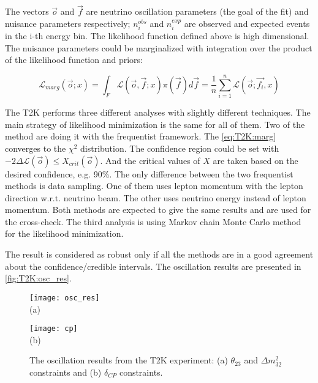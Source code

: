 \documentclass[../main.tex]{subfiles}
\begin{document}
The vectors $\overrightarrow{o}$ and $\overrightarrow{f}$ are neutrino oscillation parameters (the goal of the fit) and nuisance parameters respectively; $n_i^{obs}$ and $n_i^{exp}$ are observed and expected events in the i-th energy bin. The likelihood function defined above is high dimensional. The nuisance parameters could be marginalized with integration over the product of the likelihood function and priors:

\begin{equation}
\mathcal{L}_{marg}\left(\overrightarrow{o}; x\right)=\int_F\mathcal{L}\left(\overrightarrow{o},\overrightarrow{f};x\right)\pi(\overrightarrow{f})d\overrightarrow{f}=\frac{1}{n}\sum_{i=1}^{n}\mathcal{L}\left(\overrightarrow{o}; \overrightarrow{f_i}, x\right)
\label{eq:T2K:marg}
\end{equation}


The T2K performs three different analyses with slightly different techniques. The main strategy of likelihood minimization is the same for all of them. Two of the method are doing it with the frequentist framework. The \autoref{eq:T2K:marg} converges to the $\chi^2$ distribution. The confidence region could be set with $-2\Delta\mathcal{L}(\overrightarrow{o})\leqslant X_{crit}(\overrightarrow{o})$. And the critical values of $X$ are taken based on the desired confidence, e.g. 90\%. The only difference between the two frequentist methods is data sampling. One of them uses lepton momentum with the lepton direction w.r.t. neutrino beam. The other uses neutrino energy instead of lepton momentum. Both methods are expected to give the same results and are used for the cross-check. The third analysis is using Markov chain Monte Carlo method for the likelihood minimization.

The result is considered as robust only if all the methods are in a good agreement about the confidence/credible intervals. The oscillation results are presented in \autoref{fig:T2K:osc_res}.

\begin{figure}[!ht]
  \centering
  \begin{minipage}{0.49\linewidth}
    \centering
    \texttt{[image: osc\_res]} \\ (a)
  \end{minipage}
  \begin{minipage}{0.49\linewidth}
    \centering
    \texttt{[image: cp]} \\ (b)
  \end{minipage}
    \caption{The oscillation results from the T2K experiment: (a) $\theta_{23}$ and $\Delta m_{32}^2$ constraints and (b) $\delta_{CP}$ constraints.}
    \label{fig:T2K:osc_res}
\end{figure}
\end{document}
